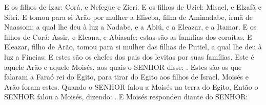 {  E os filhos de Izar: Corá, e Nefegue e Zicri.
  E os filhos de Uziel: Misael, e Elzafã e Sitri.
  E tomou para si Arão por mulher a Eliseba, filha de Aminadabe, irmã de Naassom; a qual lhe deu à luz a Nadabe, e a Abiú, e a Eleazar, e a Itamar.
  E os filhos de Corá: Assir, e Elcana, e Abiasafe: estas são as famílias dos coraítas.
  E Eleazar, filho de Arão, tomou para si mulher das filhas de Putiel, a qual lhe deu à luz a Fineias: E estes são os chefes dos pais dos levitas por suas famílias.
  Este é aquele Arão e aquele Moisés, aos quais o SENHOR disse: .
  Estes são os que falaram a Faraó rei do Egito, para tirar do Egito aos filhos de Israel. Moisés e Arão foram estes.
  Quando o SENHOR falou a Moisés na terra do Egito,
  Então o SENHOR falou a Moisés, dizendo: .
  E Moisés respondeu diante do SENHOR: 
\par }

